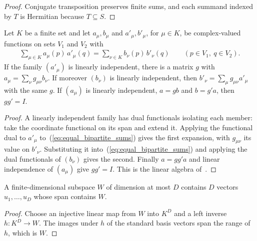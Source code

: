 \begin{proof}\leanok
    Conjugate transposition preserves finite sums, and each summand indexed by
    $T$ is Hermitian because $T\subseteq S$.
\end{proof}

\begin{lemma}
    \label{lem:equal_bipartite_sums}
    \leanok
    Let $K$ be a finite set and let $a_\mu,b_\mu$ and $a'_\mu,b'_\mu$, for
    $\mu\in K$, be complex-valued functions on sets $V_1$ and $V_2$ with
    \begin{align}
        \sum_{\mu\in K}a_\mu(p)\,a'_\mu(q)=\sum_{\nu\in K}b_\nu(p)\,b'_\nu(q)
        \qquad(p\in V_1,\ q\in V_2).
        \label{eq:equal_bipartite_sums}
    \end{align}
    If the family $(a'_\mu)$ is linearly independent, there is a matrix $g$
    with $a_\mu=\sum_\nu g_{\mu\nu}b_\nu$. If moreover $(b_\nu)$ is linearly
    independent, then $b'_\nu=\sum_\mu g_{\mu\nu}a'_\mu$ with the same $g$.
    If $(a_\mu)$ is linearly independent, $a=gb$ and $b=g'a$, then
    $gg'=I$.
\end{lemma}

\begin{proof}\leanok
    A linearly independent family has dual functionals isolating each member:
    take the coordinate functional on its span and extend it. Applying the
    functional dual to $a'_\mu$ to~(\ref{eq:equal_bipartite_sums}) gives the
    first expansion, with $g_{\mu\nu}$ its value on $b'_\nu$. Substituting
    it into~(\ref{eq:equal_bipartite_sums}) and applying the dual functionals
    of $(b_\nu)$ gives the second. Finally $a=gg'a$ and linear independence
    of $(a_\mu)$ give $gg'=I$. This is the linear algebra
    of~\cite[Lemma~5]{Molnar2018NormalPEPS}.
\end{proof}

\begin{lemma}
    \label{lem:fin_span_of_finrank}
    \leanok
    A finite-dimensional subspace $W$ of dimension at most $D$ contains $D$
    vectors $u_1,\ldots,u_D$ whose span contains $W$.
\end{lemma}

\begin{proof}\leanok
    Choose an injective linear map from $W$ into $K^D$ and a left inverse
    $h:K^D\to W$. The images under $h$ of the standard basis vectors span the
    range of $h$, which is $W$.
\end{proof}

